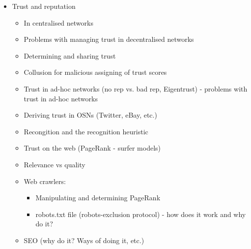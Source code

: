 \documentclass[11pt,a4paper]{report}
\begin{document}
\begin{itemize}
    \item Trust and reputation
        \begin{itemize}
            \item In centralised networks
            \item Problems with managing trust in decentralised networks
            \item Determining and sharing trust
            \item Collusion for malicious assigning of trust scores
            \item Trust in ad-hoc networks (no rep vs. bad rep, Eigentrust) - problems with trust in ad-hoc networks
            \item Deriving trust in OSNs (Twitter, eBay, etc.)
            \item Recongition and the recognition heuristic
            \item Trust on the web (PageRank - surfer models)
            \item Relevance vs quality
            \item Web crawlers:
                \begin{itemize}
                    \item Manipulating and determining PageRank
                    \item robots.txt file (robots-exclusion protocol) - how does it work and why do it?
                \end{itemize}
            \item SEO (why do it? Ways of doing it, etc.)
        \end{itemize}
\end{itemize}
\end{document}
